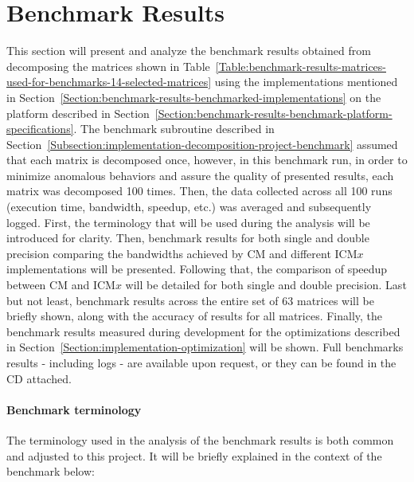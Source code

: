 \section{Benchmark Results \TO}\label{Section:comparing-decomposition-implementations-benchmark-results}
This section will present and analyze the benchmark results obtained from decomposing the matrices shown in Table~\ref{Table:benchmark-results-matrices-used-for-benchmarks-14-selected-matrices} using the implementations mentioned in Section~\ref{Section:benchmark-results-benchmarked-implementations} on the platform described in Section~\ref{Section:benchmark-results-benchmark-platform-specifications}. The benchmark subroutine described in Section~\ref{Subsection:implementation-decomposition-project-benchmark} assumed that each matrix is decomposed once, however, in this benchmark run, in order to minimize anomalous behaviors and assure the quality of presented results, each matrix was decomposed 100 times. Then, the data collected across all 100 runs (execution time, bandwidth, speedup, etc.) was averaged and subsequently logged. First, the terminology that will be used during the analysis will be introduced for clarity. Then, benchmark results for both single and double precision comparing the bandwidths achieved by CM and different ICM$ x $ implementations will be presented. Following that, the comparison of speedup between CM and ICM$ x $ will be detailed for both single and double precision. Last but not least, benchmark results across the entire set of 63 matrices will be briefly shown, along with the accuracy of results for all matrices. Finally, the benchmark results measured during development for the optimizations described in Section~\ref{Section:implementation-optimization} will be shown. Full benchmarks results - including logs - are available upon request, or they can be found in the CD attached.

\paragraph{Benchmark terminology} The terminology used in the analysis of the benchmark results is both common and adjusted to this project. It will be briefly explained in the context of the benchmark below:

